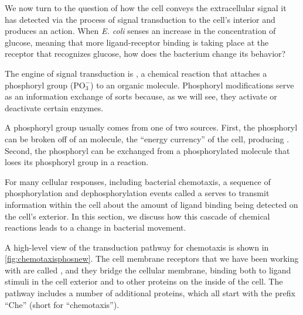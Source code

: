 We now turn to the question of how the cell conveys the extracellular signal it has detected via the process of signal transduction to the cell's interior and produces an action. When \textit{E. coli} senses an increase in the concentration of glucose, meaning that more ligand-receptor binding is taking place at the receptor that recognizes glucose, how does the bacterium change its behavior?

The engine of signal transduction is , a chemical reaction that attaches a phosphoryl group ($\text{PO}_3^{-}$) to an organic molecule.  Phosphoryl modifications serve as an information exchange of sorts because, as we will see, they activate or deactivate certain enzymes.

A phosphoryl group usually comes from one of two sources. First, the phosphoryl can be broken off of an  molecule, the ``energy currency'' of the cell, producing . Second, the phosphoryl can be exchanged from a phosphorylated molecule that loses its phosphoryl group in a  reaction.

For many cellular responses, including bacterial chemotaxis, a sequence of phosphorylation and dephosphorylation events called a  serves to transmit information within the cell about the amount of ligand binding being detected on the cell's exterior. In this section, we discuss how this cascade of chemical reactions leads to a change in bacterial movement.

A high-level view of the transduction pathway for chemotaxis is shown in \autoref{fig:chemotaxisphosnew}. The cell membrane receptors that we have been working with are called , and they bridge the cellular membrane, binding both to ligand stimuli in the cell exterior and to other proteins on the inside of the cell. The pathway includes a number of additional proteins, which all start with the prefix ``Che'' (short for ``chemotaxis'').

